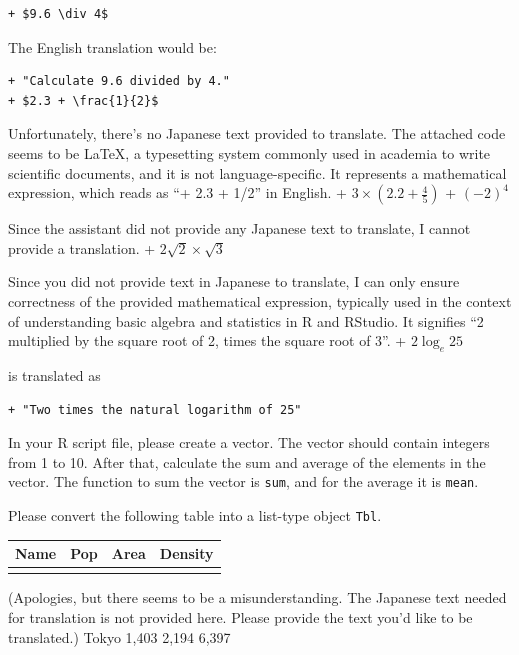 \documentclass[
  a4paper,
]{book}
\begin{document}
\begin{verbatim}
+ $9.6 \div 4$
\end{verbatim}

The English translation would be:

\begin{verbatim}
+ "Calculate 9.6 divided by 4."
+ $2.3 + \frac{1}{2}$
\end{verbatim}

Unfortunately, there's no Japanese text provided to translate. The
attached code seems to be LaTeX, a typesetting system commonly used in
academia to write scientific documents, and it is not language-specific.
It represents a mathematical expression, which reads as ``+ 2.3 + 1/2''
in English. + \(3 \times (2.2 + \frac{4}{5})\) + \((-2)^4\)

Since the assistant did not provide any Japanese text to translate, I
cannot provide a translation. + \(2\sqrt{2} \times \sqrt{3}\)

Since you did not provide text in Japanese to translate, I can only
ensure correctness of the provided mathematical expression, typically
used in the context of understanding basic algebra and statistics in R
and RStudio. It signifies ``2 multiplied by the square root of 2, times
the square root of 3''. + \(2\log_e 25\)

is translated as

\begin{verbatim}
+ "Two times the natural logarithm of 25"
\end{verbatim}

In your R script file, please create a vector. The vector should contain
integers from 1 to 10. After that, calculate the sum and average of the
elements in the vector. The function to sum the vector is \texttt{sum},
and for the average it is \texttt{mean}.

Please convert the following table into a list-type object \texttt{Tbl}.

\begin{longtable}[]{@{}lrrr@{}}
\toprule\noalign{}
Name & Pop & Area & Density \\
\midrule\noalign{}
\endhead
\bottomrule\noalign{}
\endlastfoot
\end{longtable}

(Apologies, but there seems to be a misunderstanding. The Japanese text
needed for translation is not provided here. Please provide the text
you'd like to be translated.) \textbar{} Tokyo \textbar{} 1,403
\textbar{} 2,194 \textbar{} 6,397 \textbar{}
\end{document}
